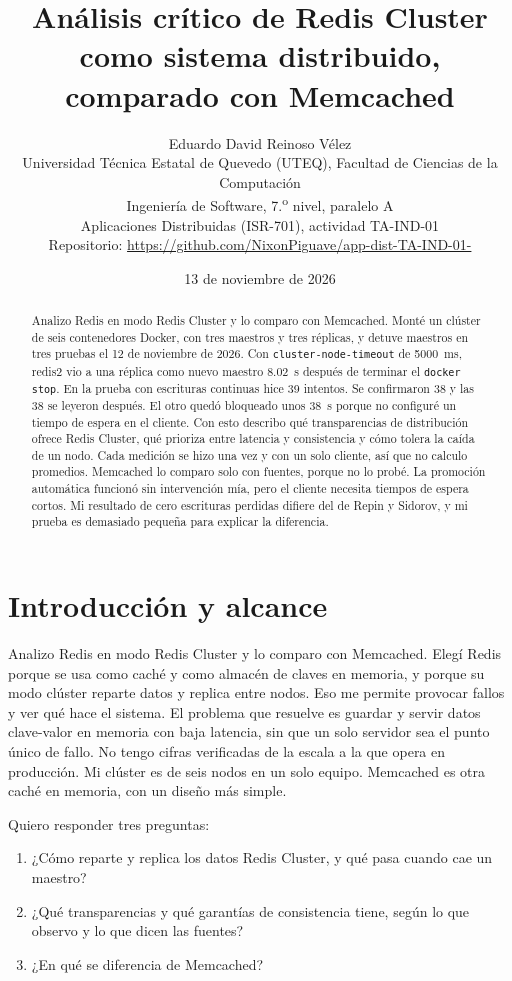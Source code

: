 \documentclass[11pt,a4paper]{article}
\title{Análisis crítico de Redis Cluster como sistema distribuido,\\comparado con Memcached}
\author{Eduardo David Reinoso Vélez\\
Universidad Técnica Estatal de Quevedo (UTEQ), Facultad de Ciencias de la Computación\\
Ingeniería de Software, 7.\textsuperscript{o} nivel, paralelo A\\
Aplicaciones Distribuidas (ISR-701), actividad TA-IND-01\\
Repositorio: \url{https://github.com/NixonPiguave/app-dist-TA-IND-01-}}
\date{13 de noviembre de 2026}
\begin{document}
\maketitle

\begin{abstract}
Analizo Redis en modo Redis Cluster y lo comparo con Memcached. Monté un clúster de seis contenedores Docker, con tres maestros y tres réplicas, y detuve maestros en tres pruebas el 12 de noviembre de 2026. Con \texttt{cluster-node-timeout} de 5000~ms, redis2 vio a una réplica como nuevo maestro 8.02~s después de terminar el \texttt{docker stop}. En la prueba con escrituras continuas hice 39 intentos. Se confirmaron 38 y las 38 se leyeron después. El otro quedó bloqueado unos 38~s porque no configuré un tiempo de espera en el cliente. Con esto describo qué transparencias de distribución ofrece Redis Cluster, qué prioriza entre latencia y consistencia y cómo tolera la caída de un nodo. Cada medición se hizo una vez y con un solo cliente, así que no calculo promedios. Memcached lo comparo solo con fuentes, porque no lo probé. La promoción automática funcionó sin intervención mía, pero el cliente necesita tiempos de espera cortos. Mi resultado de cero escrituras perdidas difiere del de Repin y Sidorov, y mi prueba es demasiado pequeña para explicar la diferencia.
\end{abstract}

\section{Introducción y alcance}

Analizo Redis en modo Redis Cluster y lo comparo con Memcached. Elegí Redis porque se usa como caché y como almacén de claves en memoria, y porque su modo clúster reparte datos y replica entre nodos. Eso me permite provocar fallos y ver qué hace el sistema. El problema que resuelve es guardar y servir datos clave-valor en memoria con baja latencia, sin que un solo servidor sea el punto único de fallo. No tengo cifras verificadas de la escala a la que opera en producción. Mi clúster es de seis nodos en un solo equipo. Memcached es otra caché en memoria, con un diseño más simple.

Quiero responder tres preguntas:
\begin{enumerate}
  \item ¿Cómo reparte y replica los datos Redis Cluster, y qué pasa cuando cae un maestro?
  \item ¿Qué transparencias y qué garantías de consistencia tiene, según lo que observo y lo que dicen las fuentes?
  \item ¿En qué se diferencia de Memcached?
\end{enumerate}
\end{document}
